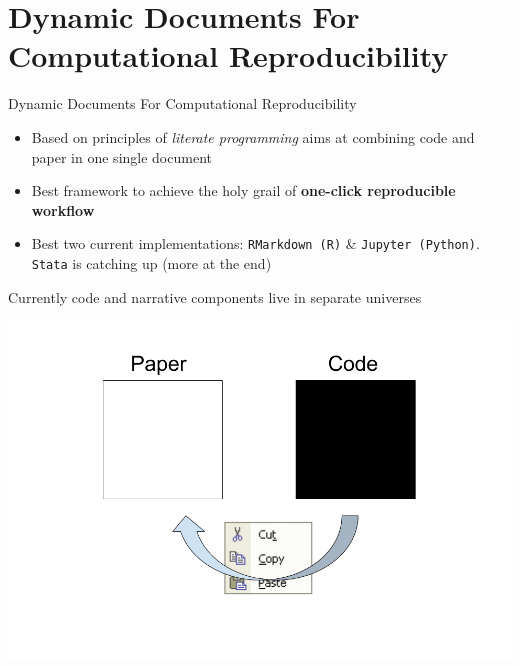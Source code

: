 \section{Dynamic Documents For Computational
Reproducibility}\label{dynamic-documents-for-computational-reproducibility}

\begin{frame}[fragile]{Dynamic Documents For Computational
Reproducibility}

\begin{itemize}
\tightlist
\item
  Based on principles of \emph{literate programming} aims at combining
  code and paper in one single document
\item
  Best framework to achieve the holy grail of \textbf{one-click
  reproducible workflow}
\item
  Best two current implementations: \texttt{RMarkdown\ (R)} \&
  \texttt{Jupyter\ (Python)}. \texttt{Stata} is catching up (more at the
  end)
\end{itemize}

\end{frame}

\begin{frame}{Currently code and narrative components live in separate
universes}

\includegraphics{./Two universes.png}

\end{frame}


